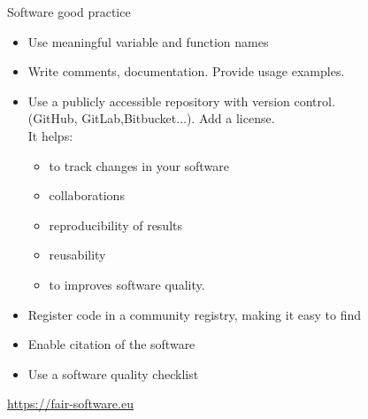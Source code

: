 \begin{frame}{Software good practice} 

\begin{itemize}
	\item Use meaningful variable and function names
	\item Write comments, documentation. Provide usage examples.
	\item Use a publicly accessible repository with version control. \\
	 (GitHub, GitLab,Bitbucket...). Add a license.\\
	It helps: 
	\begin{itemize}
	\item to track changes in your software
	\item collaborations 
	\item reproducibility of results 
	\item reusability
	\item to improves software quality. 
	\end{itemize}


	\item Register code in a community registry, making it easy to find
	\item Enable citation of the software 
	\item Use a software quality checklist
\end{itemize}

\vspace{1cm}
\begin{flushright}
{\tiny \url{https://fair-software.eu}}
\end{flushright}
\end{frame}


